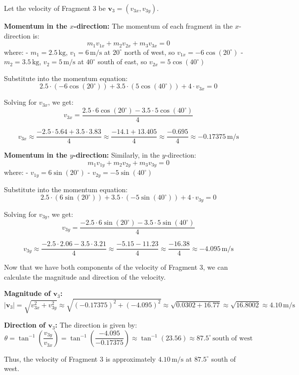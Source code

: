 \documentclass[addpoints]{exam}
\begin{document}
\begin{questions}
\begin{questions}
\begin{solution}[6cm]
Let the velocity of Fragment 3 be \( \mathbf{v}_3 = (v_{3x}, v_{3y}) \).

\textbf{Momentum in the \(x\)-direction:}  
The momentum of each fragment in the \(x\)-direction is:  
\[
m_1 v_{1x} + m_2 v_{2x} + m_3 v_{3x} = 0
\]
where:  
- \( m_1 = 2.5 \, \text{kg} \), \( v_1 = 6 \, \text{m/s} \) at \( 20^\circ \) north of west, so \( v_{1x} = -6 \cos(20^\circ) \)
- \( m_2 = 3.5 \, \text{kg} \), \( v_2 = 5 \, \text{m/s} \) at \( 40^\circ \) south of east, so \( v_{2x} = 5 \cos(40^\circ) \)

Substitute into the momentum equation:
\[
2.5 \cdot (-6 \cos(20^\circ)) + 3.5 \cdot (5 \cos(40^\circ)) + 4 \cdot v_{3x} = 0
\]

Solving for \( v_{3x} \), we get:  
\[
v_{3x} = \frac{2.5 \cdot 6 \cos(20^\circ) - 3.5 \cdot 5 \cos(40^\circ)}{4}
\]

\[
v_{3x} \approx \frac{-2.5 \cdot 5.64 + 3.5 \cdot 3.83}{4} \approx \frac{-14.1 + 13.405}{4} \approx \frac{-0.695}{4} \approx -0.17375 \, \text{m/s}
\]

\textbf{Momentum in the \(y\)-direction:}  
Similarly, in the \(y\)-direction:
\[
m_1 v_{1y} + m_2 v_{2y} + m_3 v_{3y} = 0
\]
where:  
- \( v_{1y} = 6 \sin(20^\circ) \)
- \( v_{2y} = -5 \sin(40^\circ) \)

Substitute into the momentum equation:
\[
2.5 \cdot (6 \sin(20^\circ)) + 3.5 \cdot (-5 \sin(40^\circ)) + 4 \cdot v_{3y} = 0
\]

Solving for \( v_{3y} \), we get:  
\[
v_{3y} = \frac{-2.5 \cdot 6 \sin(20^\circ) - 3.5 \cdot 5 \sin(40^\circ)}{4}
\]

\[
v_{3y} \approx \frac{-2.5 \cdot 2.06 - 3.5 \cdot 3.21}{4} \approx \frac{-5.15 - 11.23}{4} \approx \frac{-16.38}{4} \approx -4.095 \, \text{m/s}
\]

Now that we have both components of the velocity of Fragment 3, we can calculate the magnitude and direction of the velocity.

\textbf{Magnitude of \( \mathbf{v}_3 \):}  
\[
|\mathbf{v}_3| = \sqrt{v_{3x}^2 + v_{3y}^2} \approx \sqrt{(-0.17375)^2 + (-4.095)^2} \approx \sqrt{0.0302 + 16.77} \approx \sqrt{16.8002} \approx 4.10 \, \text{m/s}
\]

\textbf{Direction of \( \mathbf{v}_3 \):}  
The direction is given by:
\[
\theta = \tan^{-1}\left(\frac{v_{3y}}{v_{3x}}\right) = \tan^{-1}\left(\frac{-4.095}{-0.17375}\right) \approx \tan^{-1}(23.56) \approx 87.5^\circ \, \text{south of west}
\]

Thus, the velocity of Fragment 3 is approximately \( 4.10 \, \text{m/s} \) at \( 87.5^\circ \) south of west.


\end{solution}
\end{questions}
\end{questions}
\end{document}
